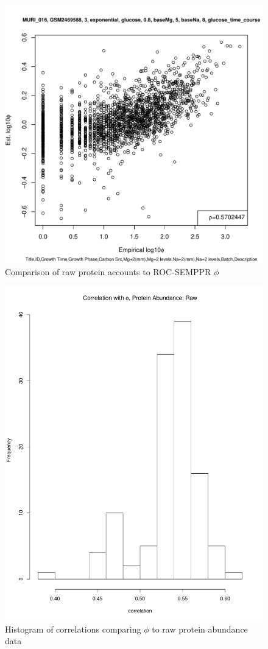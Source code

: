 \documentclass[11pt]{labbook}
\begin{document}
\begin{figure}[H]
\centering
\includegraphics[page=1,scale=0.6]{Ecoli_REL606/GSE94117_protein_raw.pdf}
\caption{Comparison of raw protein accounts to ROC-SEMPPR $\phi$}
\end{figure}

\begin{figure}[H]
\centering
\includegraphics[page=1,scale=0.6]{Ecoli_REL606/correlation_ppr_protein_raw.pdf}
\caption{Histogram of correlations comparing $\phi$ to raw protein abundance data}
\end{figure}
\end{document}
